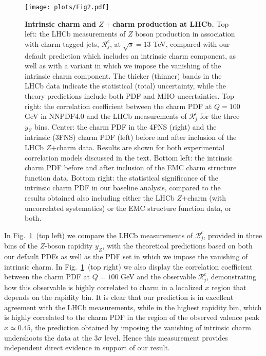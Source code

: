 \documentclass[11pt,a4paper]{article}
\begin{document}
\begin{figure}[htbp]
  \begin{center}
    \texttt{[image: plots/Fig2.pdf]}
     \caption{\small
       {\bf Intrinsic charm and $Z+$charm production at LHCb.}
       Top left: the LHCb measurements of $Z$ boson production
      in association with charm-tagged jets, $\mathcal{R}_j^c$, at $\sqrt{s}=13$ TeV,  compared with
      our default prediction which includes an intrinsic charm component,
      as well as with a variant in which we impose the
      vanishing of the intrinsic charm component.
       The thicker (thinner) bands in the LHCb data indicate the statistical
      (total) uncertainty, while the theory predictions include both PDF and MHO uncertainties.
      Top right: the correlation coefficient between
     the  charm PDF at $Q=100$ GeV in NNPDF4.0
      and the LHCb measurements of $\mathcal{R}_j^c$ 
     for the three $y_Z$ bins.
     Center: the charm PDF
     in the 4FNS (right) and the intrinsic (3FNS) charm PDF (left)
     before and after inclusion of the LHCb $Z$+charm data.
     Results are shown
     for both experimental correlation models discussed in the text.
     Bottom left: the intrinsic charm PDF before and after inclusion
     of the EMC charm structure function data.
     Bottom right: the statistical significance of the
     intrinsic charm PDF in our baseline analysis, compared to the results
     obtained also including either the LHCb $Z$+charm (with uncorrelated
     systematics) or the EMC
     structure function data, or both.
  \label{fig:ic/Zc} }
\end{center}
\end{figure}

In Fig.~\ref{fig:ic/Zc}~(top left) we compare the LHCb measurements of $\mathcal{R}_j^c$, provided
in three bins of the $Z$-boson rapidity
$y_Z$, with the theoretical predictions
 based on both our default PDFs as well as the PDF set in
 which we impose the vanishing of intrinsic charm.
 In Fig.~\ref{fig:ic/Zc}~(top right)
we also display the  correlation coefficient between
 the  charm PDF at $Q=100$ GeV 
 and the observable  $\mathcal{R}_j^c$, demonstrating how this observable
 is highly
 correlated to charm in a localized
 $x$ region that depends on the rapidity bin.
 It is clear that
 our prediction is in excellent agreement with the LHCb measurements, while in the
 highest rapidity bin, which is highly correlated to the charm PDF in
 the region of the observed valence peak $x\simeq 0.45$, the prediction
 obtained by imposing the vanishing of intrinsic charm undershoots the
 data at the $3\sigma$ level.
%
 Hence this measurement provides
 independent direct evidence in support of our result.
\end{document}
